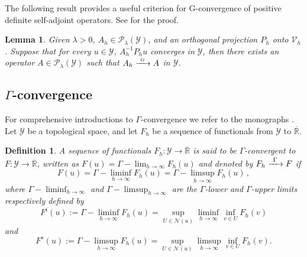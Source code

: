 \documentclass[11pt, epsf]{amsart}
\newtheorem{Def}{Definition}
\newtheorem{Lem}{Lemma}
\begin{document}
The following result provides a useful criterion for G-convergence of positive definite self-adjoint operators. See \cite{DAL} for the proof.
\begin{Lem}
\emph{
Given $\lambda>0$, $A_h\in\mathcal{P}_\lambda(\mathcal{Y})$, and an orthogonal projection $P_h$ onto $\mathscr{V}_h$. Suppose that for every $u\in\mathcal{Y}$, $A_h^{-1}P_hu$ converges in $\mathcal{Y}$, then there exists an operator $A\in\mathcal{P}_\lambda(\mathcal{Y})$ such that $A_h\xrightarrow{\;\,\text{\tiny G}\;\,}A$ in $\mathcal{Y}$.
}
\end{Lem}

\subsection{$\Gamma$-convergence}
For comprehensive introductions to $\Gamma$-convergence we refer to the monographs \cite{BRA, DAL}.\\
Let $\mathcal{Y}$ be a topological space, and let $F_h$ be a sequence
of functionals from $\mathcal{Y}$ to $\overline{\mathbb{R}}$.
\begin{Def}\emph{ A sequence of functionals $F_h:\mathcal{Y}\to \overline{\mathbb{R}}$ is said to be $\Gamma$-convergent to $F:\mathcal{Y}\to \overline{\mathbb{R}}$, written as $F(u)=\Gamma-\displaystyle\lim_{h\to\infty}F_h(u)$ and denoted by $F_h\xrightarrow{\;\,{\tiny \Gamma}\;\,}F$ if
 $$
 F(u)=\Gamma-\displaystyle\liminf_{h\to\infty}F_h(u)=\Gamma-\displaystyle\limsup_{h\to\infty} F_h(u)\,,
 $$
where $\Gamma-\displaystyle\liminf_{h\to\infty}$ and $\Gamma-\displaystyle\limsup_{h\to\infty}$ are the $\Gamma$-lower and $\Gamma$-upper limits respectively defined by
$$
F^i(u):=\Gamma-\liminf_{h\to\infty} F_h(u)=\sup_{U\in{\mathcal N}(u)}\liminf_{h\to\infty}
\inf_{v\in U}F_h(v)
$$
and
$$
F^s(u):=\Gamma-\limsup_{h\to\infty} F_h(u)=\sup_{U\in{\mathcal N}(u)}\limsup_{h\to\infty}
\inf_{v\in U}F_h(v).
$$
}
\end{Def}
\end{document}
